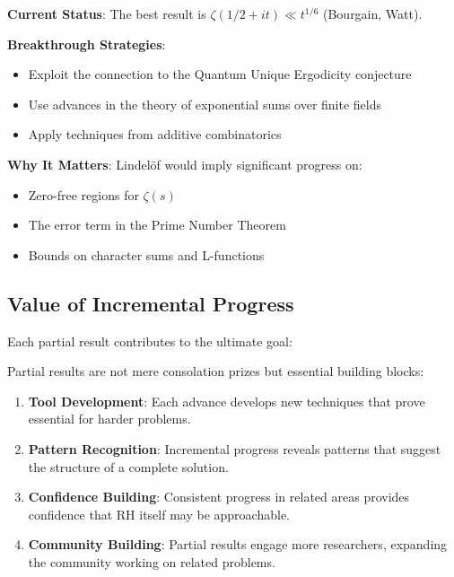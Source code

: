 \begin{research_direction}
\textbf{Current Status}: The best result is $\zeta(1/2 + it) \ll t^{1/6}$ (Bourgain, Watt).

\textbf{Breakthrough Strategies}:
\begin{itemize}
\item Exploit the connection to the Quantum Unique Ergodicity conjecture
\item Use advances in the theory of exponential sums over finite fields
\item Apply techniques from additive combinatorics
\end{itemize}

\textbf{Why It Matters}: Lindelöf would imply significant progress on:
\begin{itemize}
\item Zero-free regions for $\zeta(s)$
\item The error term in the Prime Number Theorem
\item Bounds on character sums and L-functions
\end{itemize}
\end{research_direction}

\subsection{Value of Incremental Progress}
\label{subsec:incremental_value}

Each partial result contributes to the ultimate goal:

\begin{insight}
Partial results are not mere consolation prizes but essential building blocks:
\begin{enumerate}
\item \textbf{Tool Development}: Each advance develops new techniques that prove essential for harder problems.

\item \textbf{Pattern Recognition}: Incremental progress reveals patterns that suggest the structure of a complete solution.

\item \textbf{Confidence Building}: Consistent progress in related areas provides confidence that RH itself may be approachable.

\item \textbf{Community Building}: Partial results engage more researchers, expanding the community working on related problems.
\end{enumerate}
\end{insight}

